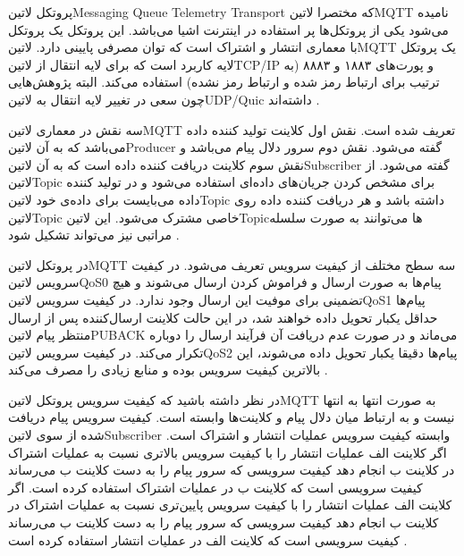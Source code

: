 پروتکل ‌لاتین{Messaging Queue Telemetry Transport} که مختصرا ‌لاتین{MQTT} نامیده می‌شود یکی از پروتکل‌ها پر استفاده در اینترنت اشیا می‌باشد.
این پروتکل یک پروتکل با معماری انتشار و اشتراک است که توان مصرفی پایینی دارد.
‌لاتین{MQTT} یک پروتکل لایه کاربرد است که برای لایه انتقال از ‌لاتین{TCP/IP} و پورت‌های ۱۸۸۳ و ۸۸۸۳ (به ترتیب برای ارتباط رمز شده و ارتباط رمز نشده) استفاده می‌کند. البته پژوهش‌هایی چون  سعی در تغییر لایه انتقال به ‌لاتین{UDP/Quic} داشته‌اند
.

سه نقش در معماری ‌لاتین{MQTT} تعریف شده است. نقش اول کلاینت تولید کننده داده می‌باشد که به آن ‌لاتین{Producer} گفته می‌شود. نقش دوم سرور دلال پیام می‌باشد و نقش سوم کلاینت دریافت کننده داده است که به آن ‌لاتین{Subscriber} گفته می‌شود.
از ‌لاتین{Topic} برای مشخص کردن جریان‌های داده‌ای استفاده می‌شود و در تولید کننده داده می‌بایست برای داده‌ی خود ‌لاتین{Topic} داشته باشد و هر دریافت کننده داده روی ‌لاتین{Topic} خاصی مشترک می‌شود.
این ‌لاتین{Topic}ها می‌توانند به صورت سلسله مراتبی نیز می‌تواند تشکیل شود
.

در پروتکل ‌لاتین{‌MQTT} سه سطح مختلف از کیفیت سرویس تعریف می‌شود. در کیفیت سرویس ‌لاتین{QoS0} پیام‌ها به صورت ارسال و فراموش کردن ارسال می‌شوند و هیچ تضمینی برای موفیت این ارسال وجود ندارد.
در کیفیت سرویس ‌لاتین{QoS1} پیام‌ها حداقل یکبار تحویل داده خواهند شد، در این حالت کلاینت ارسال‌کننده پس از ارسال منتظر پیام ‌لاتین{PUBACK} می‌ماند و در صورت عدم دریافت آن فرآیند ارسال را دوباره تکرار می‌کند.
در کیفیت سرویس ‌لاتین{QoS2} پیام‌ها دقیقا یکبار تحویل داده می‌شوند، این بالاترین کیفیت سرویس بوده و منابع زیادی را مصرف می‌کند
.

در نظر داشته باشید که کیفیت سرویس پروتکل ‌لاتین{MQTT} به صورت انتها به انتها نیست و به ارتباط میان دلال پیام و کلاینت‌ها وابسته است.
کیفیت سرویس پیام دریافت شده از سوی ‌لاتین{Subscriber} وابسته کیفیت سرویس عملیات انتشار و اشتراک است. اگر کلاینت الف عملیات انتشار را با کیفیت سرویس بالاتری
نسبت به عملیات اشتراک در کلاینت ب انجام دهد کیفیت سرویسی که سرور پیام را به دست کلاینت ب می‌رساند کیفیت سرویسی است که کلاینت ب در عملیات اشتراک استفاده کرده است.
اگر کلاینت الف عملیات انتشار را با کیفیت سرویس پایین‌تری نسبت به عملیات اشتراک در کلاینت ب انجام دهد کیفیت سرویسی که سرور پیام را به دست کلاینت ب می‌رساند کیفیت سرویسی است که
کلاینت الف در عملیات انتشار استفاده کرده است
.

